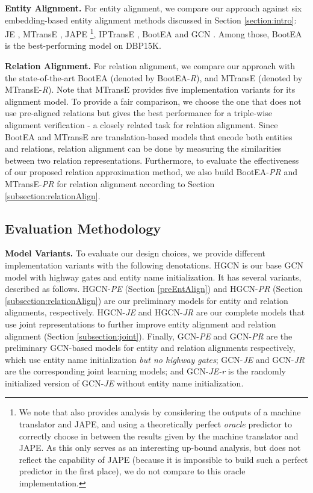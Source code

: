\documentclass[11pt,a4paper]{article}
\newcommand\cparagraph[1]{\vspace{1mm}\noindent\textbf{#1.}}
\begin{document}
\cparagraph{Entity Alignment}
For entity alignment, we compare our approach against six embedding-based entity alignment methods discussed in
Section \ref{section:intro}: JE \cite{hao2016joint}, MTransE \cite{chen2016multilingual}, JAPE \cite{sun2017cross}\footnote{We note
	that \cite{sun2017cross} also provides analysis by considering the outputs of a machine translator and JAPE, and using a theoretically
	perfect \emph{oracle} predictor to correctly choose in between the results given by the machine translator and JAPE. As this only
	serves as an interesting up-bound analysis, but does not reflect the capability of JAPE (because it is impossible to build such a perfect predictor in the first place),
	we do not compare to this oracle implementation. },
IPTransE \cite{zhu2017iterative}, BootEA \cite{ijcai2018-611} and GCN \cite{D18-1032}. Among those, BootEA is the best-performing model on DBP15K.


\cparagraph{Relation Alignment}
For relation alignment, we compare our approach with the state-of-the-art BootEA (denoted by BootEA-\emph{R}), and MTransE (denoted by MTransE-\emph{R}).
Note that MTransE provides five implementation variants for its alignment model. To provide a fair comparison, we choose the one that does
not use pre-aligned relations but gives the best performance for a triple-wise alignment verification \cite{chen2016multilingual} - a
closely related task for relation alignment. Since BootEA and MTransE are translation-based models that encode both entities and
relations, relation alignment can be done by measuring the similarities between two relation representations. Furthermore, to evaluate the
effectiveness of our proposed relation approximation method, we also build BootEA-\emph{PR} and MTransE-\emph{PR} for relation alignment according
to Section \ref{subsection:relationAlign}. 	


\subsection{Evaluation Methodology}
\cparagraph{Model Variants}
To evaluate our design choices, we provide different implementation variants with the following denotations.
HGCN is our base GCN model with highway gates and entity name initialization. It has several variants, described as follows. HGCN-\emph{PE
}(Section \ref{preEntAlign}) and HGCN-\emph{PR} (Section \ref{subsection:relationAlign}) are our preliminary models for entity and
relation alignments, respectively. HGCN-\emph{JE} and HGCN-\emph{JR} are our complete models that use joint representations to further improve entity alignment and relation alignment (Section \ref{subsection:joint}). Finally, GCN-\emph{PE} and GCN-\emph{PR} are the preliminary GCN-based models for entity and relation alignments respectively, which use
entity name initialization \emph{but no highway gates}; GCN-\emph{JE} and GCN-\emph{JR} are the corresponding joint learning models; and GCN-\emph{JE-r} is the randomly initialized version of GCN-\emph{JE} without entity name initialization.
\end{document}
